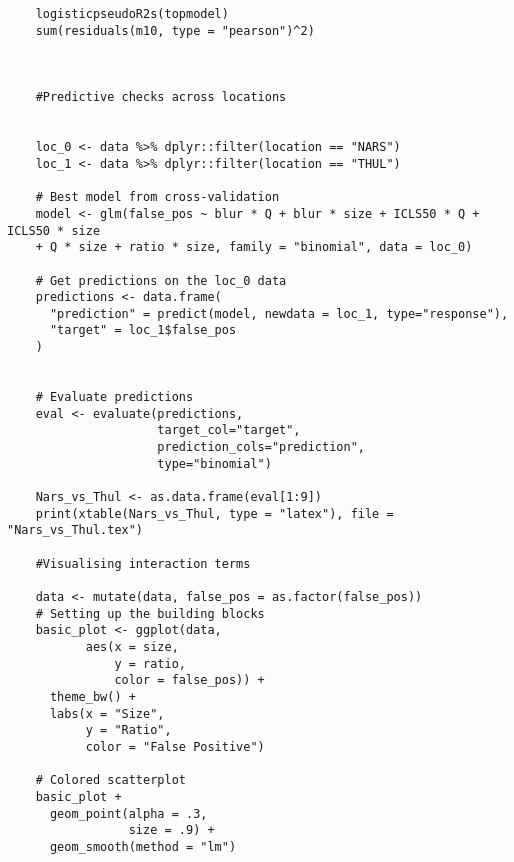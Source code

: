 \documentclass[12pt]{article}
\begin{document}
\begin{verbatim}
	logisticpseudoR2s(topmodel)
	sum(residuals(m10, type = "pearson")^2)
	

	
	#Predictive checks across locations

	
	loc_0 <- data %>% dplyr::filter(location == "NARS")
	loc_1 <- data %>% dplyr::filter(location == "THUL")
	
	# Best model from cross-validation
	model <- glm(false_pos ~ blur * Q + blur * size + ICLS50 * Q + ICLS50 * size
	+ Q * size + ratio * size, family = "binomial", data = loc_0)
	
	# Get predictions on the loc_0 data
	predictions <- data.frame(
	  "prediction" = predict(model, newdata = loc_1, type="response"),
	  "target" = loc_1$false_pos
	)
	
	
	# Evaluate predictions
	eval <- evaluate(predictions, 
					 target_col="target", 
					 prediction_cols="prediction",
					 type="binomial")
	
	Nars_vs_Thul <- as.data.frame(eval[1:9])
	print(xtable(Nars_vs_Thul, type = "latex"), file = "Nars_vs_Thul.tex")
	
	#Visualising interaction terms

	data <- mutate(data, false_pos = as.factor(false_pos))
	# Setting up the building blocks
	basic_plot <- ggplot(data,
		   aes(x = size,
			   y = ratio,
			   color = false_pos)) +
	  theme_bw() +
	  labs(x = "Size",
		   y = "Ratio",
		   color = "False Positive")
	
	# Colored scatterplot
	basic_plot +
	  geom_point(alpha = .3, 
				 size = .9) +
	  geom_smooth(method = "lm")

\end{verbatim}
\end{document}
